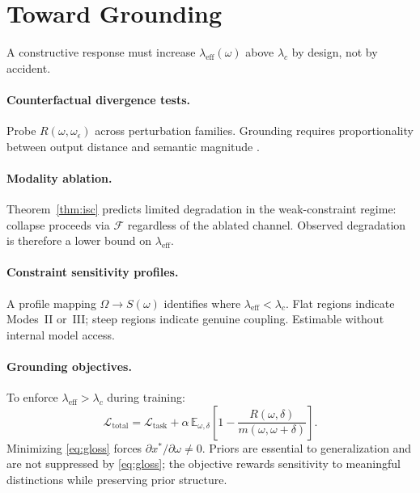 \documentclass[twocolumn,10pt]{article}
\theoremstyle{thmstyle}
\theoremstyle{defstyle}
\newcommand{\Fprior}{\mathcal{F}}
\newcommand{\leff}{\lambda_{\mathrm{eff}}}
\newcommand{\Rop}{R}
\begin{document}
\section{Toward Grounding}
\label{sec:toward}

A constructive response must increase $\leff(\omega)$ above $\lambda_c$
by design, not by accident.

\paragraph{Counterfactual divergence tests.}
Probe $\Rop(\omega,\omega_\epsilon)$ across perturbation families.
Grounding requires proportionality between output distance and semantic
magnitude \citep{lake2017building}.

\paragraph{Modality ablation.}
Theorem~\ref{thm:isc} predicts limited degradation in the weak-constraint
regime: collapse proceeds via $\Fprior$ regardless of the ablated
channel. Observed degradation is therefore a lower bound on $\leff$.

\paragraph{Constraint sensitivity profiles.}
A profile mapping $\Omega\to S(\omega)$ identifies where $\leff<\lambda_c$.
Flat regions indicate Modes~II or~III; steep regions indicate genuine
coupling. Estimable without internal model access.

\paragraph{Grounding objectives.}
To enforce $\leff>\lambda_c$ during training:
\begin{equation}
  \mathcal{L}_{\mathrm{total}} =
  \mathcal{L}_{\mathrm{task}}
  + \alpha\,\mathbb{E}_{\omega,\delta}
  \!\left[1-\frac{\Rop(\omega,\delta)}{m(\omega,\omega+\delta)}\right].
  \label{eq:gloss}
\end{equation}
Minimizing \eqref{eq:gloss} forces $\partial x^*/\partial\omega\neq 0$.
Priors are essential to generalization \citep{tenenbaum2011grow} and are
not suppressed by \eqref{eq:gloss}; the objective rewards sensitivity to
meaningful distinctions while preserving prior structure.
\end{document}
